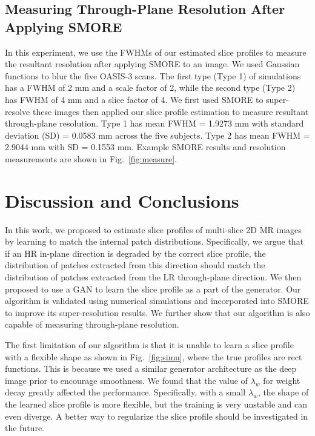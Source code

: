\documentclass[runningheads]{llncs}
\begin{document}
\subsection{Measuring Through-Plane Resolution After Applying SMORE}

In this experiment, we use the FWHMs of our estimated slice profiles
to measure the resultant resolution after applying SMORE to an image.
We used Gaussian functions to blur the five OASIS-3 scans. The first
type (Type 1) of simulations has a FWHM of 2 mm and a scale factor of
2, while the second type (Type 2) has FWHM of 4 mm and a slice factor
of 4. We first
used SMORE to super-resolve these images then applied our slice
profile estimation to measure resultant through-plane resolution. Type
1 has mean FWHM = 1.9273 mm with standard deviation (SD) = 0.0583 mm
across the five subjects. Type 2 has mean FWHM = 2.9044 mm with SD =
0.1553 mm. Example SMORE results and resolution measurements are shown
in Fig.~\ref{fig:measure}.

\section{Discussion and Conclusions}

In this work, we proposed to estimate slice profiles of multi-slice 2D
MR images by learning to match the internal patch distributions.
Specifically, we argue that if an HR in-plane direction is degraded by
the correct slice profile, the distribution of patches extracted from
this direction should match the distribution of patches extracted from
the LR through-plane direction. We then proposed to use a GAN to learn
the slice profile as a part of the generator. Our algorithm is
validated using numerical simulations and incorporated into SMORE to
improve its super-resolution results. We further show that our
algorithm is also capable of measuring through-plane resolution.

The first limitation of our algorithm is that it is unable to learn a
slice profile with a flexible shape as shown in Fig.~\ref{fig:simu},
where the true profiles are rect functions. This is because we used a
similar generator architecture as the deep image prior to encourage
smoothness. We found that the value of $\lambda_w$ for weight decay
greatly affected the performance. Specifically, with a small
$\lambda_w$, the shape of the learned slice profile is more flexible, but
the training is very unstable and can even diverge. A better way to
regularize the slice profile should be investigated in the future.
\end{document}
